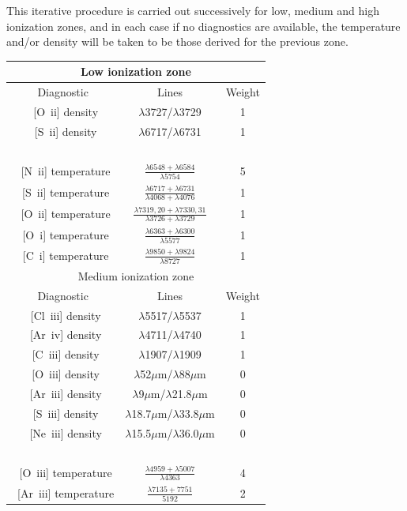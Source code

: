 \documentclass[useAMS,usenatbib]{mn2e}
\begin{document}
This iterative procedure is carried out successively for low, medium and high ionization zones, and in each case if no diagnostics are available, the temperature and/or density will be taken to be those derived for the previous zone.

\begin{table}
\begin{tabular}{ccc}
\hline
\multicolumn{3}{c}{Low ionization zone}\\
\hline
Diagnostic & Lines & Weight \\
~[O~{\sc ii}] density & $\lambda$3727/$\lambda$3729 & 1 \\
~[S~{\sc ii}] density & $\lambda$6717/$\lambda$6731 & 1 \\
~\\
~[N~{\sc ii}] temperature & $\frac{\lambda 6548 + \lambda 6584}{\lambda 5754}$ & 5 \\
~[S~{\sc ii}] temperature & $\frac{\lambda 6717 + \lambda 6731}{\lambda 4068 +  \lambda 4076}$ & 1 \\
~[O~{\sc ii}] temperature & $\frac{\lambda 7319,20 + \lambda 7330,31}{\lambda 3726 + \lambda 3729}$ & 1 \\
~[O~{\sc i}] temperature & $\frac{\lambda 6363 + \lambda 6300}{\lambda 5577}$ & 1 \\
~[C~{\sc i}] temperature & $\frac{\lambda 9850 + \lambda 9824}{\lambda 8727}$ & 1 \\
\hline
\multicolumn{3}{c}{Medium ionization zone}\\
\hline
Diagnostic & Lines & Weight \\
~[Cl~{\sc iii}] density & $\lambda$5517/$\lambda$5537 & 1 \\
~[Ar~{\sc iv}] density & $\lambda$4711/$\lambda$4740 & 1 \\
~[C~{\sc iii}] density & $\lambda$1907/$\lambda$1909 & 1 \\
~[O~{\sc iii}] density & $\lambda$52$\mu$m/$\lambda$88$\mu$m & 0 \\
~[Ar~{\sc iii}] density & $\lambda$9$\mu$m/$\lambda$21.8$\mu$m & 0 \\
~[S~{\sc iii}] density & $\lambda$18.7$\mu$m/$\lambda$33.8$\mu$m & 0 \\
~[Ne~{\sc iii}] density & $\lambda$15.5$\mu$m/$\lambda$36.0$\mu$m & 0 \\
~\\
~[O~{\sc iii}] temperature & $\frac{\lambda 4959 + \lambda 5007}{\lambda 4363}$ & 4\\
~[Ar~{\sc iii}] temperature & $\frac{\lambda 7135 + 7751}{5192}$ & 2\\

\end{tabular}
\end{table}
\end{document}
